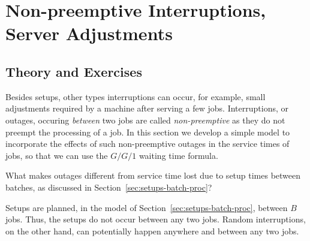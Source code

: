 \section{Non-preemptive Interruptions, Server Adjustments}
\label{sec:non-preempt-interr}

\subsection*{Theory and Exercises}



Besides setups, other types interruptions can occur, for example, small adjustments required by a machine after serving a few jobs.  Interruptions, or outages, occuring \emph{between} two jobs are called \emph{non-preemptive} as they do not preempt the processing of a job.  In this section we develop a simple model to incorporate the effects of such non-preemptive outages in the service times of jobs, so that we can use the $G/G/1$ waiting time formula. 


\begin{exercise}
  What makes outages different from service time lost due to setup times between batches, as discussed in Section~\ref{sec:setups-batch-proc}?  
  \begin{solution}
Setups are planned, in the model of Section~\ref{sec:setups-batch-proc}, between $B$ jobs. Thus, the setups do not occur between any two jobs.  Random interruptions, on the other hand, can potentially happen anywhere and between any two jobs. 
  \end{solution}
\end{exercise}


